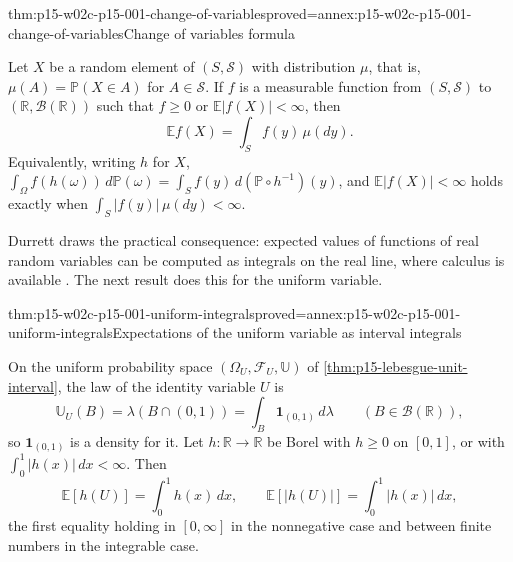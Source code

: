 \begin{hbcorollary}{thm:p15-w02c-p15-001-change-of-variables}{proved=annex:p15-w02c-p15-001-change-of-variables}{Change of variables formula}
\par\nobreak
Let \(X\) be a random element of \((S,\mathcal S)\) with distribution
\(\mu\), that is, \(\mu(A)=\mathbb P(X\in A)\) for \(A\in\mathcal S\).
If \(f\) is a measurable function from \((S,\mathcal S)\) to
\((\mathbb R,\mathcal B(\mathbb R))\) such that \(f\geq0\) or
\(\mathbb E|f(X)|<\infty\), then
\[
 \mathbb E f(X)=\int_S f(y)\,\mu(dy).
\]
Equivalently, writing \(h\) for \(X\),
\(\int_\Omega f(h(\omega))\,d\mathbb P(\omega)
=\int_S f(y)\,d(\mathbb P\circ h^{-1})(y)\), and \(\mathbb E|f(X)|<\infty\)
holds exactly when \(\int_S|f(y)|\,\mu(dy)<\infty\).
\end{hbcorollary}

Durrett draws the practical consequence: expected values of functions of
real random variables can be computed as integrals on the real line, where
calculus is available \cite[sec.~1.6.3, pp.~32--33]{DurrettPTEAuthor2019}.
The next result does this for the uniform variable.

\begin{hbcorollary}{thm:p15-w02c-p15-001-uniform-integrals}{proved=annex:p15-w02c-p15-001-uniform-integrals}{Expectations of the uniform variable as interval integrals}
\par\nobreak
On the uniform probability space \((\Omega_U,\mathcal F_U,\mathbb U)\) of
\cref{thm:p15-lebesgue-unit-interval}, the law of the identity variable
\(U\) is
\[
 \mathbb U_U(B)=\lambda(B\cap(0,1))=\int_B\mathbf1_{(0,1)}\,d\lambda
 \qquad(B\in\mathcal B(\mathbb R)),
\]
so \(\mathbf1_{(0,1)}\) is a density for it. Let \(h:\mathbb R\to\mathbb R\)
be Borel with \(h\geq0\) on \([0,1]\), or with
\(\int_0^1|h(x)|\,dx<\infty\). Then
\[
 \mathbb E[h(U)]=\int_0^1h(x)\,dx,\qquad
 \mathbb E[|h(U)|]=\int_0^1|h(x)|\,dx,
\]
the first equality holding in \([0,\infty]\) in the nonnegative case and
between finite numbers in the integrable case.
\end{hbcorollary}


